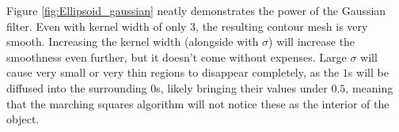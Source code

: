 \documentclass[a4paper,10pt]{report}
\begin{document}
Figure \ref{fig:Ellipsoid_gaussian} neatly demonstrates the power of the Gaussian filter. Even with kernel width of only $3$, the resulting contour mesh is very smooth. Increasing the kernel width (alongside with $\sigma$) will increase the smoothness even further, but it doesn't come without expenses. Large $\sigma$ will cause very small or very thin regions to disappear completely, as the $1$s will be diffused into the surrounding $0$s, likely bringing their values under $0.5$, meaning that the marching squares algorithm will not notice these as the interior of the object.
\end{document}
